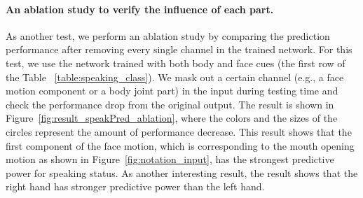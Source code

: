 \paragraph{An ablation study to verify the influence of each part.} As another test, we perform an ablation study by comparing the prediction performance after removing every single channel in the trained network. For this test, we use the network trained with both body and face cues (the first row of the Table ~\ref{table:speaking_class}). We mask out a certain channel (e.g., a face motion component or a body joint part) in the input during testing time and check the performance drop from the original output. The result is shown in Figure~\ref{fig:result_speakPred_ablation}, where the colors and the sizes of the circles represent the amount of performance decrease. This result shows that the first component of the face motion, which is corresponding to the mouth opening motion as shown in Figure~\ref{fig:notation_input}, has the strongest predictive power for speaking status. As another interesting result, the result shows that the right hand has stronger predictive power than the left hand.  

